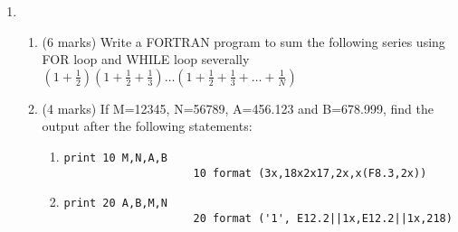 \documentclass[class=book,crop=false]{standalone}
\begin{document}
\begin{enumerate}
        \item \begin{enumerate}
            \item (6 marks) Write a FORTRAN program to sum the following series using FOR loop and WHILE loop severally $ (1+\frac{1}{2})(1+\frac{1}{2}+\frac{1}{3})\dots(1+\frac{1}{2}+\frac{1}{3}+\dots+\frac{1}{N}) $
            \item (4 marks) If M=12345, N=56789, A=456.123 and B=678.999, find the output after the following statements:
            \begin{enumerate}
                \item \begin{lstlisting}[numbers=none]
                    print 10 M,N,A,B
                    10 format (3x,18x2x17,2x,x(F8.3,2x))
                \end{lstlisting}
                \item \begin{lstlisting}[numbers=none]
                    print 20 A,B,M,N
                    20 format ('1', E12.2||1x,E12.2||1x,218)
                \end{lstlisting}
                

\end{enumerate}
\end{enumerate}
\end{enumerate}
\end{document}
